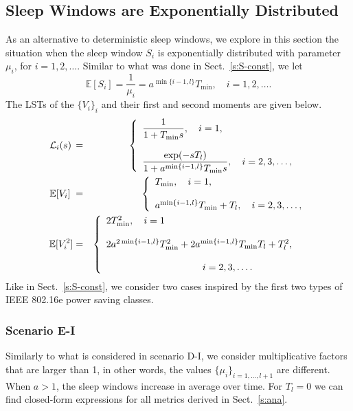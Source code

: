 \documentclass[journal]{IEEEtran}
\newcommand {\beq} {\begin{equation}}
\newcommand {\eeq} {\end{equation}}
\newcommand {\barr} {\begin{array}}
\newcommand {\earr} {\end{array}}
\newcommand {\bears} {\begin{eqnarray*}}
\newcommand {\eears} {\end{eqnarray*}}
\def \E{{\mathbb E}}
\begin{document}
\subsection {Sleep Windows are Exponentially Distributed}
\label{s:S-exp}
As an alternative to deterministic sleep windows, we explore in this
section the situation when the sleep window $S_i$ is exponentially
distributed with parameter $\mu_i$, for $i=1,2,\ldots$. Similar to what was
done in Sect.~\ref{s:S-const}, we let
\beq
\E[S_i]=\frac{1}{\mu_i}=a^{\min\{i-1,l\} }T_{\min},\quad i=1,2,\ldots.
\label{e:Si-exp}
\eeq
The LSTs of the $\{V_i\}_i$ and their first and second moments are given
below.
\bears
{\cal L}_i(s)\,&=&\left\{
\barr{ll}
\displaystyle{\frac{1}{1+T_{\min}s}} , \quad i=1,\\
& \\
\displaystyle{\frac{\exp(-sT_l)}{1+a^{\min\{i-1,l\}}T_{\min}s}} , \quad i=2,3,\ldots,\\
\earr\right.\\
\E[V_i]\;&=&\left\{
\barr{ll}
T_{\min} , \quad i=1,\\
\\
a^{\min\{i-1,l\}}T_{\min}+T_l , \quad i=2,3,\ldots,\\
\earr\right.\\
\E[V_i^2]&=&\left\{
\barr{ll}
2T_{\min}^2 , \quad i=1\phantom{,3,\ldots.}\\
&\\
2a^{2\min\{i-1,l\}}T_{\min}^2+2a^{\min\{i-1,l\}}T_{\min}T_l+T_l^2 , \\
&\\\qquad\qquad\qquad\qquad\qquad i=2,3,\ldots.
\earr\right.
\eears
Like in Sect.~\ref{s:S-const}, we consider two cases inspired by the
first two types of IEEE 802.16e power saving classes.
\subsubsection*{Scenario E-I}
Similarly to what is considered in scenario D-I, we consider
multiplicative factors that are larger than 1, in other words, the
values $\{\mu_i\}_{i=1,\ldots,l+1}$ are different. When $a>1$, the sleep windows
increase in average over time. For $T_l=0$ we can find closed-form
expressions for all metrics derived in Sect.~\ref{s:ana}.
\end{document}
